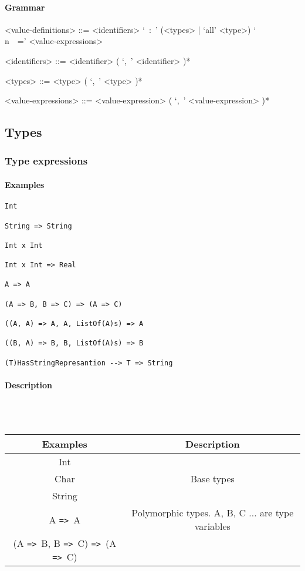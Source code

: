 \documentclass{article}
\def\ra{\texttt{=>}\ }
\def\pend{\mbox{} \\\\}
\begin{document}
\paragraph{Grammar}
\begin{grammar}
<value-definitions> ::=
<identifiers> `\ :\ ' (<types> | `all' <type>) `\\n\ \ =' <value-expressions>

<identifiers> ::= <identifier> ( `,\ ' <identifier> )*  

<types> ::= <type> ( `,\ ' <type> )*  

<value-expressions> ::= <value-expression> ( `,\ ' <value-expression> )*  
\end{grammar}


\subsection{Types}

\subsubsection{Type expressions}

\paragraph{Examples}

\begin{verbatim}
Int

String => String 

Int x Int 

Int x Int => Real

A => A

(A => B, B => C) => (A => C)

((A, A) => A, A, ListOf(A)s) => A

((B, A) => B, B, ListOf(A)s) => B

(T)HasStringRepresantion --> T => String
\end{verbatim}

\paragraph{Description}\pend
\begin{tabular}{ |c|c| } 
\hline
Examples & Description \\ 
\hline
\hline
Int & \\
Char & Base types \\
String & \\ 
\hline
A \ra A &
Polymorphic types. A, B, C ... are type variables
\\
(A \ra B, B \ra C) \ra (A \ra C) &
\\ 
\hline
\end{tabular}
\end{document}

